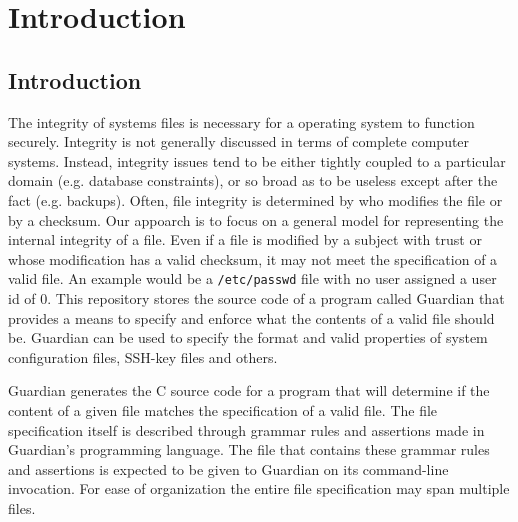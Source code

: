 
\chapter{Introduction}
{
	\section{Introduction}
	{
		The integrity of systems files is necessary for a operating system to
		function securely.  Integrity is not generally discussed in terms of
		complete computer systems. Instead, integrity issues tend to be either
		tightly coupled to a particular domain (e.g. database constraints), or
		so broad as to be useless except after the fact (e.g. backups).
		Often, file integrity is determined by who modifies the file or by a
		checksum. Our appoarch is to focus on a general model for representing
		the internal integrity of a file. Even if a file is modified by a
		subject with trust or whose modification has a valid checksum, it may
		not meet the specification of a valid file. An example would be a
		\texttt{/etc/passwd} file with no user assigned a user id of 0. This
		repository stores the source code of a program called Guardian that
		provides a means to specify and enforce what the contents of a valid
		file should be.
		Guardian can be used to specify the format and valid properties of
		system configuration files, SSH-key files and others.
		
		Guardian generates the C source code for a program that will determine
		if the content of a given file matches the specification of a valid
		file. The file specification itself is
		described through grammar rules and assertions made in Guardian's
		programming language. The file that contains these grammar rules and
		assertions is expected to be given to Guardian on its command-line
		invocation.
		For ease of organization the entire file specification may span multiple
		files.
	}
}



















